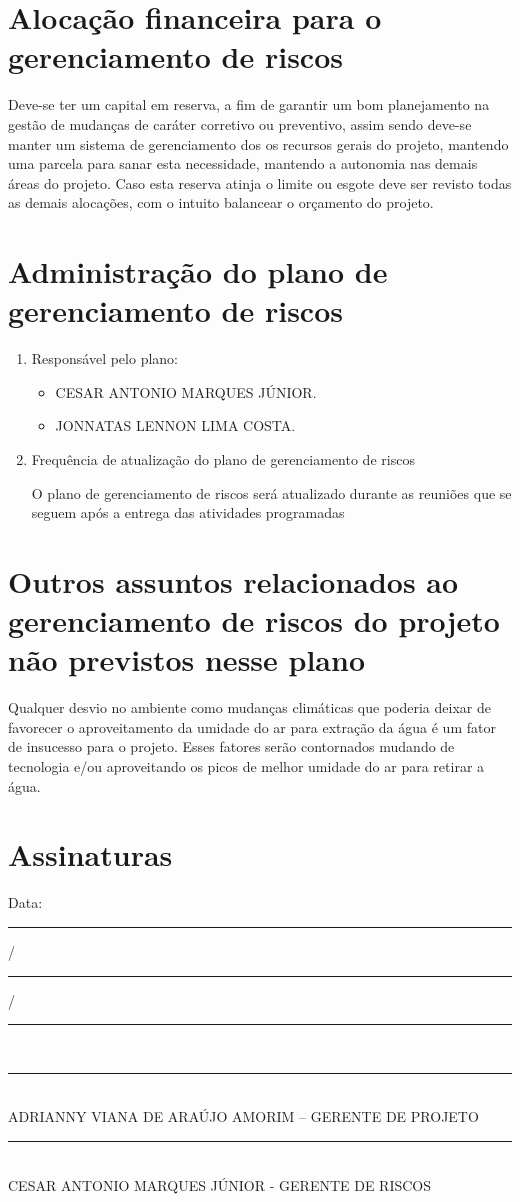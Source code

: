 \section{Alocação financeira para o gerenciamento de riscos}
Deve-se ter um capital em reserva, a fim de garantir um bom planejamento na gestão de mudanças de caráter corretivo ou preventivo, assim sendo deve-se manter um sistema de gerenciamento dos os recursos gerais do projeto, mantendo uma parcela para sanar esta necessidade, mantendo a autonomia nas demais áreas do projeto.
Caso esta reserva atinja o limite ou esgote deve ser revisto todas as demais alocações, com o intuito balancear o orçamento do projeto.

\section{Administração do plano de gerenciamento de riscos}
\begin{enumerate}
\item Responsável pelo plano:
\begin{itemize}
\item CESAR ANTONIO MARQUES JÚNIOR.
\item JONNATAS LENNON LIMA COSTA.
\end{itemize}
\item Frequência de atualização do plano de gerenciamento de riscos

O plano de gerenciamento de riscos será atualizado durante as reuniões que se seguem após a entrega das atividades programadas
\end{enumerate}

\section{Outros assuntos relacionados ao gerenciamento de riscos do projeto não previstos nesse plano}
Qualquer desvio no ambiente como mudanças climáticas que poderia deixar de favorecer o aproveitamento da umidade do ar para extração da água é um fator de insucesso para o projeto. Esses fatores serão contornados mudando de tecnologia e/ou aproveitando os picos de melhor umidade do ar para retirar a água.

\section{Assinaturas}
\begin{center}
Data: \rule{0.5cm}{0.1mm}/\rule{0.5cm}{0.1mm}/\rule{1cm}{0.1mm}     \\
\rule{13cm}{0.1mm}\\
ADRIANNY VIANA DE ARAÚJO AMORIM – GERENTE DE PROJETO\\
\rule{13cm}{0.1mm}\\
CESAR ANTONIO MARQUES JÚNIOR - GERENTE DE RISCOS


\end{center}
% 